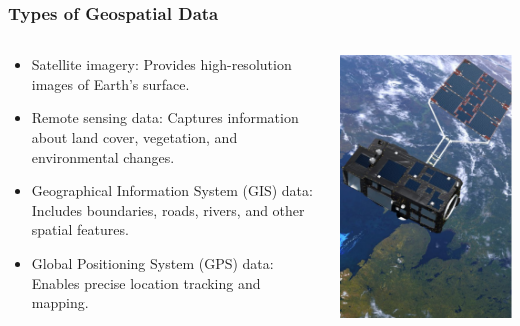\documentclass[xcolor=x11names,aspectratio=169, compress]{beamer}
\renewcommand{\(}{\begin{columns}}
\renewcommand{\)}{\end{columns}}
\newcommand{\<}[1]{\begin{column}{#1}}
\renewcommand{\>}{\end{column}}
\begin{document}
\begin{frame}
    \frametitle{Types of Geospatial Data}
    \begin{columns}[T]
        \begin{column}{0.7\textwidth}
            \begin{itemize}[<+->]
                \item Satellite imagery: Provides high-resolution images of Earth's surface.
                \item Remote sensing data: Captures information about land cover, vegetation, and environmental changes.
                \item Geographical Information System (GIS) data: Includes boundaries, roads, rivers, and other spatial features.
                \item Global Positioning System (GPS) data: Enables precise location tracking and mapping.
            \end{itemize}
        \end{column}
        \begin{column}{0.3\textwidth}
            \includegraphics[width=\textwidth]{Satellite.PNG}
        \end{column}
    \end{columns}
\end{frame}
\end{document}
